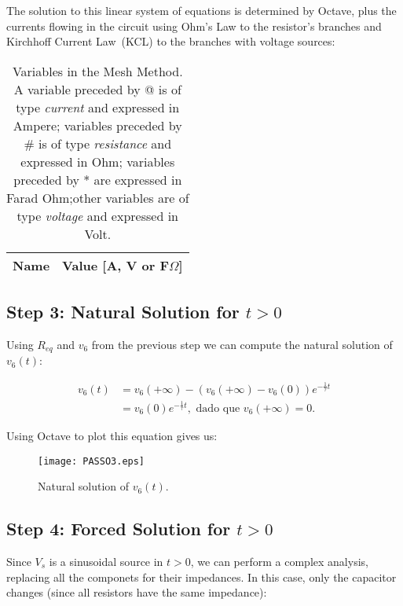 The solution to this linear system of equations is determined by Octave, plus the currents flowing in the circuit using Ohm's Law to the resistor's branches and Kirchhoff Current Law~(KCL) to the branches with voltage sources:

\begin{table}[h]
  \centering
  \begin{tabular}{|l|r|}
    \hline    
    {\bf Name} & {\bf Value [A, V or F$\Omega$]} \\ \hline
    
  \end{tabular}
  \caption{Variables in the Mesh Method. A variable preceded by @ is of type {\em current} and expressed in Ampere; variables preceded by \# is of type {\em resistance} and expressed in Ohm; variables preceded by * are expressed in Farad Ohm;other variables are of type {\em voltage} and expressed in Volt.}
  \label{tab:TEO_PASSO2}
\end{table}


\subsection{Step 3: Natural Solution for $t>0$}

Using $R_{eq}$ and $v_6$ from the previous step we can compute the natural solution of $v_6(t)$:

\begin{equation}
	\begin{split}
	v_6(t) 	&= v_6(+\infty) - (v_6(+\infty) - v_6(0))e^{-\frac{1}{\tau}t}		\\				
			&= v_6(0)e^{-\frac{1}{\tau}t}, \text{ dado que } v_6(+\infty) = 0.
	\end{split}
\end{equation}

Using Octave to plot this equation gives us:

\begin{figure}[h] \centering
\texttt{[image: PASSO3.eps]}
\caption{Natural solution of $v_6(t)$.}
\label{fig:TEO_NAT_SOL}
\end{figure}

\subsection{Step 4: Forced Solution for $t>0$}

Since $V_s$ is a sinusoidal source in $t>0$, we can perform a complex analysis, replacing all the componets for their impedances. In this case, only the capacitor changes (since all resistors have the same impedance):

